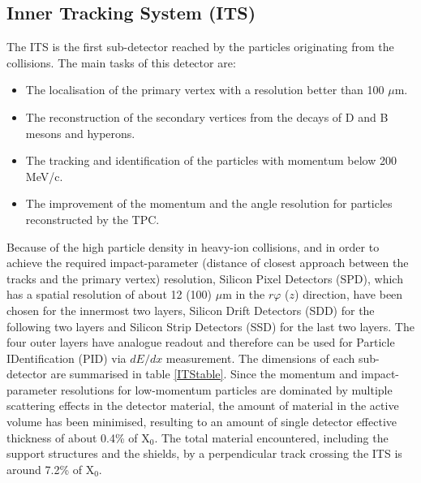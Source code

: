 \documentclass[b5paper,10pt,twoside,oldstyle,classica]{toptesi}
\begin{document}
\subsection{Inner Tracking System (ITS)}
\label{ITS_sec}
The ITS \cite{Nooren:2007zz} is the first sub-detector reached by the particles originating from the collisions. The main tasks of this detector are:
\begin{itemize}
\item The localisation of the primary vertex with a resolution better than 100 $\mu$m.
\item The reconstruction of the secondary vertices from the decays of D and B mesons and hyperons.
\item The tracking and identification of the particles with momentum below 200 MeV/c. 
\item The improvement of the momentum and the angle resolution for particles reconstructed by the TPC.
\end{itemize}
Because of the high particle density in heavy-ion collisions, and in order to achieve the required impact-parameter (distance of closest approach between the tracks and the primary vertex) resolution, Silicon Pixel Detectors (SPD), which has a spatial resolution of about 12 (100) $\mu$m in the $r\varphi$ ($z$) direction, have been chosen for the innermost two layers, Silicon Drift Detectors (SDD) for the following two layers and Silicon Strip Detectors (SSD) for the last two layers. The four outer layers have analogue readout and therefore can be used for Particle IDentification (PID) via $dE/dx$ measurement. 
The dimensions of each sub-detector are summarised in table \ref{ITStable}. Since the momentum and impact-parameter resolutions for low-momentum particles are dominated by multiple scattering effects in the detector material, the amount of material in the active volume has been minimised, resulting to an amount of single detector effective thickness of about 0.4\% of X$_0$. The total material encountered, including the support structures and the shields, by a perpendicular track crossing the ITS is around 7.2\% of X$_0$.
\end{document}
